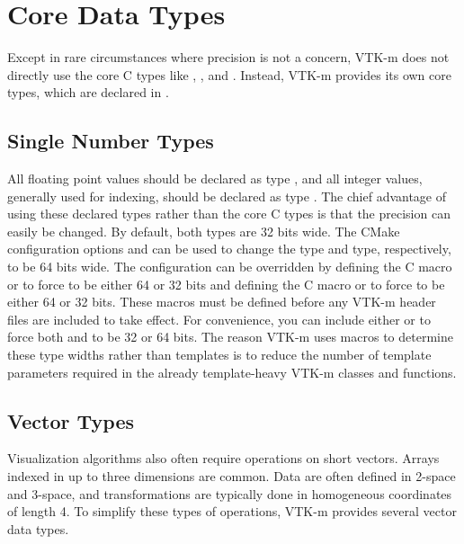 \section{Core Data Types}
\label{sec:CoreDataTypes}

Except in rare circumstances where precision is not a concern, VTK-m does
not directly use the core C types like , ,
and . Instead, VTK-m provides its own core types, which
are declared in .

\subsection{Single Number Types}

All floating point values should be declared as type , and all
integer values, generally used for indexing, should be declared as type
. The chief advantage of using these declared types rather than
the core C types is that the precision can easily be changed. By default,
both types are 32 bits wide. The CMake configuration options
 and
 can be used to change the 
type and  type, respectively, to be 64 bits wide. The
configuration can be overridden by defining the C macro
 or
 to force  to be either
64 or 32 bits and defining the C macro  or
 to force  to be either 64 or 32
bits. These macros must be defined before any VTK-m header files are
included to take effect. For convenience, you can include either
 or
 to force both 
and  to be 32 or 64 bits. The reason VTK-m uses macros to
determine these type widths rather than templates is to reduce the number
of template parameters required in the already template-heavy VTK-m classes
and functions.

\subsection{Vector Types}

Visualization algorithms also often require operations on short vectors.
Arrays indexed in up to three dimensions are common. Data are often defined
in 2-space and 3-space, and transformations are typically done in
homogeneous coordinates of length 4. To simplify these types of operations,
VTK-m provides several vector data types.

